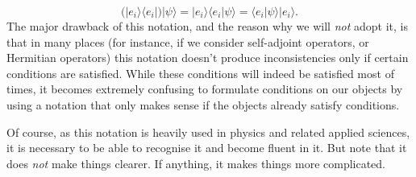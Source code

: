 \begin{equation*}
\bigl(|e_i\rangle\langle e_i |\bigr) |\psi\rangle=|e_i\rangle\langle e_i |\psi\rangle =\langle e_i |\psi\rangle |e_i\rangle.
\end{equation*}
The major drawback of this notation, and the reason why we will \emph{not} adopt it, is that in many places (for instance, if we consider self-adjoint operators, or Hermitian operators) this notation doesn't produce inconsistencies only if certain conditions are satisfied. While these conditions will indeed be satisfied most of times, it becomes extremely confusing to formulate conditions on our objects by using a notation that only makes sense if the objects already satisfy conditions.

Of course, as this notation is heavily used in physics and related applied sciences, it is necessary to be able to recognise it and become fluent in it.  But note that it does \emph{not} make things clearer. If anything, it makes things more complicated.








